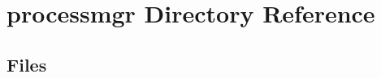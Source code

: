 \section{processmgr Directory Reference}
\label{dir_ea1fb1dcdc50a98f827e77011f89f674}
\subsection*{Files}
\begin{DoxyCompactItemize}
\end{DoxyCompactItemize}
